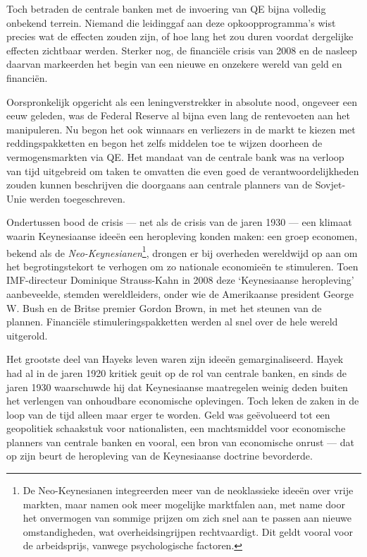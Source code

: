 \documentclass[
  a5paper,
  smalldemyvopaper,11pt,twoside,onecolumn,openright,extrafontsizes,
hidelinks]{memoir}
\begin{document}
Toch betraden de centrale banken met de invoering van QE bijna volledig
onbekend terrein. Niemand die leidinggaf aan deze opkoopprogramma's wist
precies wat de effecten zouden zijn, of hoe lang het zou duren voordat
dergelijke effecten zichtbaar werden. Sterker nog, de financiële crisis
van 2008 en de nasleep daarvan markeerden het begin van een nieuwe en
onzekere wereld van geld en financiën.

Oorspronkelijk opgericht als een leningverstrekker in absolute nood,
ongeveer een eeuw geleden, was de Federal Reserve al bijna even lang de
rentevoeten aan het manipuleren. Nu begon het ook winnaars en verliezers
in de markt te kiezen met reddingspakketten en begon het zelfs middelen
toe te wijzen doorheen de vermogensmarkten via QE. Het mandaat van de
centrale bank was na verloop van tijd uitgebreid om taken te omvatten
die even goed de verantwoordelijkheden zouden kunnen beschrijven die
doorgaans aan centrale planners van de Sovjet-Unie werden toegeschreven.

Ondertussen bood de crisis --- net als de crisis van de jaren 1930 ---
een klimaat waarin Keynesiaanse ideeën een heropleving konden maken: een
groep economen, bekend als de \emph{Neo-Keynesianen}\footnote{De
  Neo-Keynesianen integreerden meer van de neoklassieke ideeën over
  vrije markten, maar namen ook meer mogelijke marktfalen aan, met name
  door het onvermogen van sommige prijzen om zich snel aan te passen aan
  nieuwe omstandigheden, wat overheidsingrijpen rechtvaardigt. Dit geldt
  vooral voor de arbeidsprijs, vanwege psychologische factoren.},
drongen er bij overheden wereldwijd op aan om het begrotingstekort te
verhogen om zo nationale economieën te stimuleren. Toen IMF-directeur
Dominique Strauss-Kahn in 2008 deze `Keynesiaanse heropleving'
aanbeveelde, stemden wereldleiders, onder wie de Amerikaanse president
George W. Bush en de Britse premier Gordon Brown, in met het steunen van
de plannen. Financiële stimuleringspakketten werden al snel over de hele
wereld uitgerold.

Het grootste deel van Hayeks leven waren zijn ideeën gemarginaliseerd.
Hayek had al in de jaren 1920 kritiek geuit op de rol van centrale
banken, en sinds de jaren 1930 waarschuwde hij dat Keynesiaanse
maatregelen weinig deden buiten het verlengen van onhoudbare economische
oplevingen. Toch leken de zaken in de loop van de tijd alleen maar erger
te worden. Geld was geëvolueerd tot een geopolitiek schaakstuk voor
nationalisten, een machtsmiddel voor economische planners van centrale
banken en vooral, een bron van economische onrust --- dat op zijn beurt
de heropleving van de Keynesiaanse doctrine bevorderde.
\end{document}
